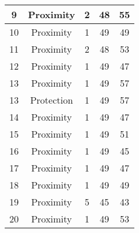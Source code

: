 \documentclass[results.tex]{subfiles}
\begin{document}
\begin{center}
\begin{tabular}{| c || c | c | c | c |}
            \hline
            9                       & Proximity                    & 2                      & 48                      & 55                   \\
            \hline
            10                      & Proximity                    & 1                      & 49                      & 49                   \\
            \hline
            11                      & Proximity                    & 2                      & 48                      & 53                   \\
            \hline
            12                      & Proximity                    & 1                      & 49                      & 47                   \\
            \hline
            13                      & Proximity                    & 1                      & 49                      & 57                   \\
            \hline
            13                      & Protection                   & 1                      & 49                      & 57                   \\
            \hline
            14                      & Proximity                    & 1                      & 49                      & 47                   \\
            \hline
            15                      & Proximity                    & 1                      & 49                      & 51                   \\
            \hline
            16                      & Proximity                    & 1                      & 49                      & 45                   \\
            \hline
            17                      & Proximity                    & 1                      & 49                      & 47                   \\
            \hline
            18                      & Proximity                    & 1                      & 49                      & 49                   \\
            \hline
            19                      & Proximity                    & 5                      & 45                      & 43                   \\
            \hline
            20                      & Proximity                    & 1                      & 49                      & 53                   \\

\end{tabular}
\end{center}
\end{document}
